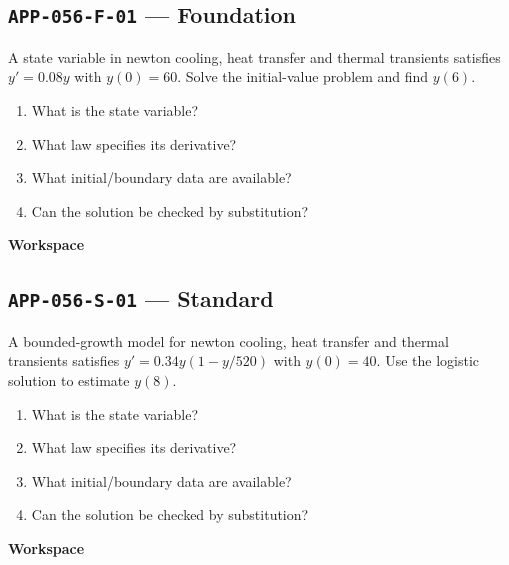 \documentclass[11pt]{book}
\newcommand{\pid}[1]{\texttt{#1}}
\newcommand{\workspace}{\par\vspace{0.7in}\hrulefill\par\vspace{0.55in}\hrulefill\par}
\begin{document}
\subsection*{\pid{APP-056-F-01} — Foundation}
\begin{problembox}
A state variable in newton cooling, heat transfer and thermal transients satisfies $y'=0.08y$ with $y(0)=60$. Solve the initial-value problem and find $y(6)$.
\end{problembox}
\begin{promptbox}\begin{enumerate}
\item What is the state variable?
\item What law specifies its derivative?
\item What initial/boundary data are available?
\item Can the solution be checked by substitution?
\end{enumerate}\end{promptbox}
\textbf{Workspace}\workspace
{}
\subsection*{\pid{APP-056-S-01} — Standard}
\begin{problembox}
A bounded-growth model for newton cooling, heat transfer and thermal transients satisfies $y'=0.34y(1-y/520)$ with $y(0)=40$. Use the logistic solution to estimate $y(8)$.
\end{problembox}
\begin{promptbox}\begin{enumerate}
\item What is the state variable?
\item What law specifies its derivative?
\item What initial/boundary data are available?
\item Can the solution be checked by substitution?
\end{enumerate}\end{promptbox}
\textbf{Workspace}\workspace
{}
\end{document}
